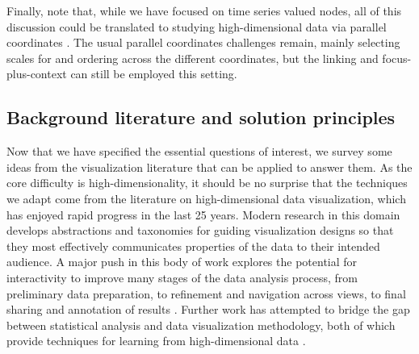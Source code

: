 Finally, note that, while we have focused on time series valued nodes,
all of this discussion could be translated to studying high-dimensional
data via parallel coordinates \citep{inselberg1991parallel}. The usual parallel
coordinates challenges remain, mainly selecting scales for and ordering
across the different coordinates, but the linking and focus-plus-context
can still be employed this setting.

\subsection{Background literature and solution principles}
\label{background-literature-and-solution-principles}

Now that we have specified the essential questions of interest, we survey some
ideas from the visualization literature that can be applied to answer them. As
the core difficulty is high-dimensionality, it should be no surprise that the
techniques we adapt come from the literature on high-dimensional data
visualization, which has enjoyed rapid progress in the last 25 years. Modern
research in this domain develops abstractions and taxonomies for guiding
visualization designs so that they most effectively communicates properties of
the data to their intended audience. A major push in this body of work explores
the potential for interactivity to improve many stages of the data analysis
process, from preliminary data preparation, to refinement and navigation across
views, to final sharing and annotation of results \citep{heer2012taxonomy}.
Further work has attempted to bridge the gap between statistical analysis and
data visualization methodology, both of which provide techniques for learning
from high-dimensional data \citep{de2003visual}.

